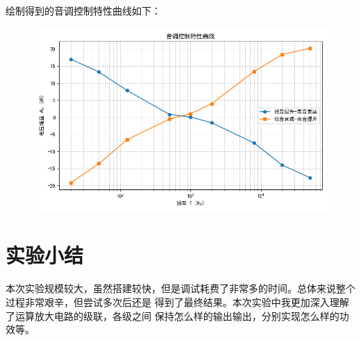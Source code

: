 \documentclass[a4paper,11pt,UTF8]{article}
\numberwithin{equation}{subsection}
\begin{document}
绘制得到的音调控制特性曲线如下：
\begin{figure}
	\centering
	\includegraphics[width=0.8\linewidth]{5.png}
\end{figure}


\section{实验小结}
本次实验规模较大，虽然搭建较快，但是调试耗费了非常多的时间。总体来说整个过程非常艰辛，但尝试多次后还是
得到了最终结果。本次实验中我更加深入理解了运算放大电路的级联，各级之间
保持怎么样的输出输出，分别实现怎么样的功效等。
\end{document}
